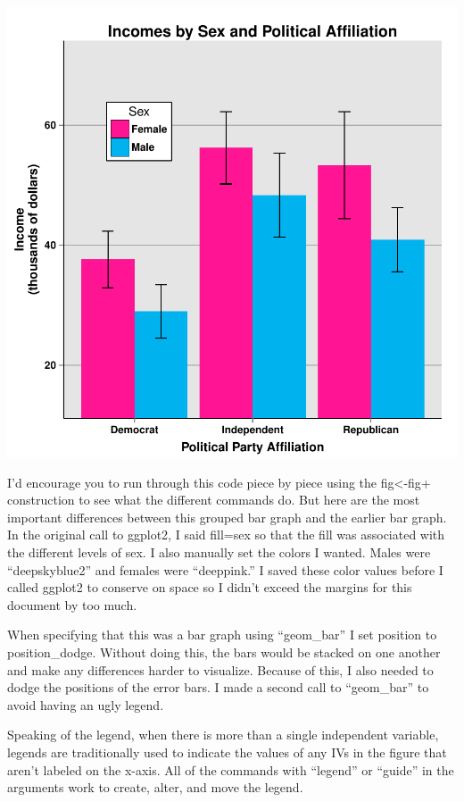 \documentclass[12pt]{article}
\begin{document}
\includegraphics{Reproducibility-058}

I'd encourage you to run through this code piece by piece using the fig<-fig+
construction to see what the different commands do. But here are the most
important differences between this grouped bar graph and the earlier bar graph.
In the original call to ggplot2, I said fill=sex so that the fill was associated
with the different levels of sex. I also manually set the colors I wanted.
Males were ``deepskyblue2'' and females were ``deeppink.'' I saved these color
values before I called ggplot2 to conserve on space so I didn't exceed the margins
for this document by too much.

When specifying that this was a bar graph using ``geom\_bar'' I set position to
position\_dodge. Without doing this, the bars would be stacked on one another
and make any differences harder to visualize. Because of this, I also needed to
dodge the positions of the error bars. I made a second call to ``geom\_bar'' to
avoid having an ugly legend.

Speaking of the legend, when there is more than a single independent variable,
legends are traditionally used to indicate the values of any IVs in the figure
that aren't labeled on the x-axis. All of the commands with ``legend'' or ``guide''
in the arguments work to create, alter, and move the legend.
\end{document}
